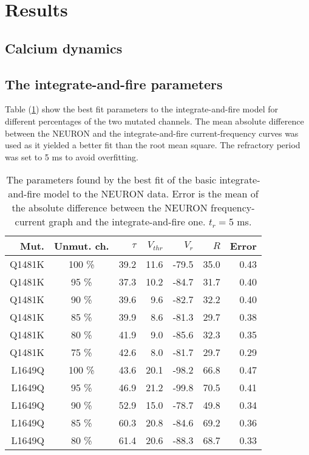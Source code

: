 \documentclass[twocolumn, a4paper,10pt, norsk]{scrartcl}
\begin{document}
\section*{Results}
\subsection*{Calcium dynamics}
\subsection*{The integrate-and-fire parameters}
Table (\ref{table:integrate-and-fire_parameters}) show the best fit parameters to the integrate-and-fire model for different percentages of the two mutated channels. The mean absolute difference between the NEURON and the integrate-and-fire current-frequency curves was used as it yielded a better fit than the root mean square. The refractory period was set to 5 ms to avoid overfitting.

\begin{table}
 \centering
 \caption{The parameters found by the best fit of the basic integrate-and-fire model to the NEURON data. Error is the mean of the absolute difference between the NEURON frequency-current graph and the integrate-and-fire one. $t_r=$5 ms.}
 \begin{tabular}{r|c|r|r|r|r|r} 
  Mut. & Unmut. ch. & $\tau$ & $V_{thr}$ & $V_{r}$ & $R$ & Error\\
  \hline
  Q1481K & 100 \% & 39.2 & 11.6 & -79.5 & 35.0 & 0.43\\
  Q1481K &  95 \% & 37.3 & 10.2 & -84.7 & 31.7 & 0.40\\
  Q1481K &  90 \% & 39.6 &  9.6 & -82.7 & 32.2 & 0.40\\
  Q1481K &  85 \% & 39.9 &  8.6 & -81.3 & 29.7 & 0.38\\
  Q1481K &  80 \% & 41.9 &  9.0 & -85.6 & 32.3 & 0.35\\
  Q1481K &  75 \% & 42.6 &  8.0 & -81.7 & 29.7 & 0.29\\
  \hline
  L1649Q & 100 \% & 43.6 & 20.1 & -98.2 & 66.8 & 0.47\\
  L1649Q &  95 \% & 46.9 & 21.2 & -99.8 & 70.5 & 0.41\\
  L1649Q &  90 \% & 52.9 & 15.0 & -78.7 & 49.8 & 0.34\\
  L1649Q &  85 \% & 60.3 & 20.8 & -84.6 & 69.2 & 0.36\\
  L1649Q &  80 \% & 61.4 & 20.6 & -88.3 & 68.7 & 0.33\\
 \end{tabular}
\label{table:integrate-and-fire_parameters}
\end{table}
\end{document}
